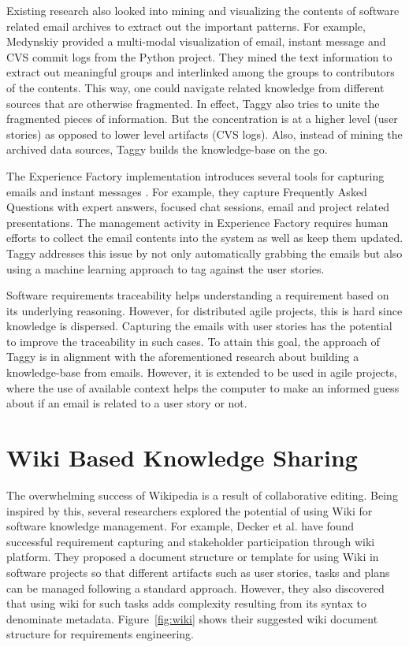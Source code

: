 Existing research also looked into mining and visualizing the contents of software related email archives to extract out the important patterns. For example, Medynskiy provided a multi-modal visualization of email, instant message and CVS commit logs from the Python project\cite{using_hybrid}. They mined the text information to extract out meaningful groups and interlinked among the groups to contributors of the contents. This way, one could navigate related knowledge from different sources that are otherwise fragmented. In effect, Taggy also tries to unite the fragmented pieces of information. But the concentration is at a higher level (user stories) as opposed to lower level artifacts (CVS logs). Also, instead of mining the archived data sources, Taggy builds the knowledge-base on the go.

The Experience Factory implementation introduces several tools for capturing emails and instant messages \cite{implementing_an_experience}. For example, they capture Frequently Asked Questions with expert answers, focused chat sessions, email and project related presentations. The management activity in Experience Factory requires human efforts to collect the email contents into the system as well as keep them updated. Taggy addresses this issue by not only automatically grabbing the emails but also using a machine learning approach to tag against the user stories.

Software requirements traceability helps understanding a requirement based on its underlying reasoning\cite{automating_requirements}. However, for distributed agile projects, this is hard since knowledge is dispersed. Capturing the emails with user stories has the potential to improve the traceability in such cases. To attain this goal, the approach of Taggy is in alignment with the aforementioned research about building a knowledge-base from emails. However, it is extended to be used in agile projects, where the use of available context helps the computer to make an informed guess about if an email is related to a user story or not.

\section{Wiki Based Knowledge Sharing}
The overwhelming success of Wikipedia \cite{wikipedia} is a result of collaborative editing. Being inspired by this, several researchers explored the potential of using Wiki for software knowledge management. For example, Decker et al. have found successful requirement capturing and stakeholder participation through wiki platform\cite{wiki_based}. They proposed a document structure or template for using Wiki in software projects so that different artifacts such as user stories, tasks and plans can be managed following a standard approach. However, they also discovered that using wiki for such tasks adds complexity resulting from its syntax to denominate metadata. Figure~\ref{fig:wiki} shows their suggested wiki document structure for requirements engineering.

